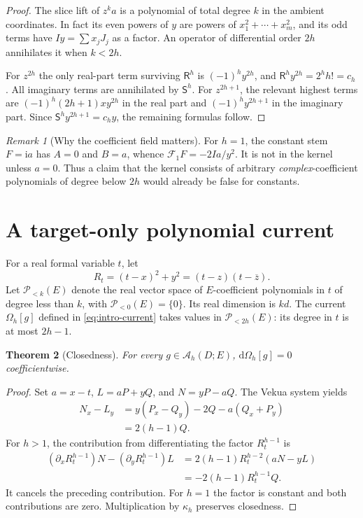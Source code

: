 \documentclass[11pt,a4paper]{article}
\numberwithin{equation}{section}
\newtheorem{theorem}{Theorem}[section]
\theoremstyle{definition}
\theoremstyle{remark}
\newtheorem{remark}[theorem]{Remark}
\newcommand{\ii}{\mathrm i}
\newcommand{\AM}{\mathcal A_h}
\newcommand{\PP}{\mathscr P_{<2h}(E)}
\newcommand{\PPl}[1]{\mathscr P_{<#1}(E)}
\newcommand{\Om}{\Omega_h}
\newcommand{\barz}{\overline z}
\newcommand{\Rop}{\mathsf R}
\newcommand{\Sop}{\mathsf S}
\begin{document}
\begin{proof}
The slice lift of $z^ka$ is a polynomial of total degree $k$ in the ambient
coordinates. In fact its even powers of $y$ are powers of
$x_1^2+\cdots+x_m^2$, and its odd terms have $Iy=\sum x_jJ_j$ as a factor.
An operator of differential order $2h$ annihilates it when $k<2h$.

For $z^{2h}$ the only real-part term surviving $\Rop^h$ is
$(-1)^hy^{2h}$, and
$\Rop^hy^{2h}=2^hh!=c_h$. All imaginary terms are annihilated by $\Sop^h$.
For $z^{2h+1}$, the relevant highest terms are
$(-1)^h(2h+1)xy^{2h}$ in the real part and
$(-1)^hy^{2h+1}$ in the imaginary part. Since
$\Sop^hy^{2h+1}=c_hy$, the remaining formulas follow.
\end{proof}

\begin{remark}[Why the coefficient field matters]
For $h=1$, the constant stem $F=\ii a$ has $A=0$ and $B=a$, whence
$\mathcal F_1F=-2Ia/y^2$. It is not in the kernel unless $a=0$.
Thus a claim that the kernel consists of arbitrary \emph{complex}-coefficient
polynomials of degree below $2h$ would already be false for constants.
\end{remark}

\section{A target-only polynomial current}
\label{sec:current}

For a real formal variable $t$, let
\begin{equation}\label{eq:rt}
 R_t=(t-x)^2+y^2=(t-z)(t-\barz).
\end{equation}
Let $\PPl{k}$ denote the real vector space of $E$-coefficient polynomials in
$t$ of degree less than $k$, with $\PPl{0}=\{0\}$. Its real dimension is $kd$.
The current $\Om[g]$ defined in \eqref{eq:intro-current} takes values in $\PP$:
its degree in $t$ is at most $2h-1$.

\begin{theorem}[Closedness]\label{thm:closed}
For every $g\in\AM(D;E)$, $\mathrm d\Om[g]=0$ coefficientwise.
\end{theorem}

\begin{proof}
Set $a=x-t$, $L=aP+yQ$, and $N=yP-aQ$. The Vekua system yields
\begin{align*}
 N_x-L_y
 &=y(P_x-Q_y)-2Q-a(Q_x+P_y)\\
 &=2(h-1)Q.
\end{align*}
For $h>1$, the contribution from differentiating the factor $R_t^{h-1}$ is
\begin{align*}
 (\partial_xR_t^{h-1})N-(\partial_yR_t^{h-1})L
 &=2(h-1)R_t^{h-2}(aN-yL)\\
 &=-2(h-1)R_t^{h-1}Q.
\end{align*}
It cancels the preceding contribution. For $h=1$ the factor is constant and
both contributions are zero. Multiplication by $\kappa_h$ preserves closedness.
\end{proof}
\end{document}
